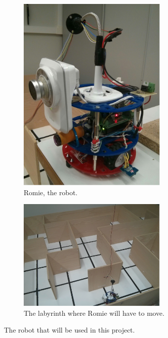 \begin{figure}[ht]
	\centering
	\begin{subfigure}{0.35\textwidth}
		\centering
		\includegraphics[width=0.8\textwidth]{fig/romie.jpg}
		\caption{Romie, the robot.}\label{subfig:romie}
	\end{subfigure}\quad
	\begin{subfigure}{0.55\textwidth}
		\centering
		\includegraphics[width=0.8\textwidth]{fig/labyrinth.jpg}
		\caption{The labyrinth where Romie will have to move.}\label{subfig:labyrinth}
	\end{subfigure}\quad
	\caption{The robot that will be used in this project.}
\end{figure}

